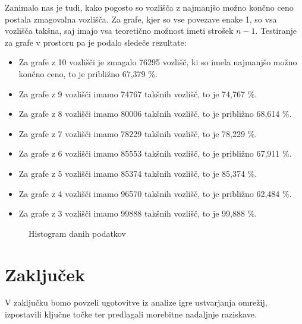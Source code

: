 \documentclass[fin1, tisk]{fmfdelo}
\begin{document}
Zanimalo nas je tudi, kako pogosto so vozlišča z najmanjšo možno končno ceno postala zmagovalna vozlišča. Za grafe, kjer so vse povezave enake 1, so vsa vozlišča takšna, saj imajo vsa teoretično možnost imeti strošek \(n-1\). Testiranje za grafe v prostoru pa je podalo sledeče rezultate:

\begin{itemize}
    \item Za grafe z 10 vozlišči je zmagalo 76295 vozlišč, ki so imela najmanjšo možno končno ceno, to je približno 67,379 \%.
    \item Za grafe z 9 vozlišči imamo 74767 takšnih vozlišč, to je 74,767 \%.
    \item Za grafe z 8 vozlišči imamo 80006 takšnih vozlišč, to je približno 68,614 \%.
    \item Za grafe z 7 vozlišči imamo 78229 takšnih vozlišč, to je 78,229 \%.
    \item Za grafe z 6 vozlišči imamo 85553 takšnih vozlišč, to je približno 67,911 \%.
    \item Za grafe z 5 vozlišči imamo 85374 takšnih vozlišč, to je 85,374 \%.
    \item Za grafe z 4 vozlišči imamo 96570 takšnih vozlišč, to je približno 62,484 \%.
    \item Za grafe z 3 vozlišči imamo 99888 takšnih vozlišč, to je 99,888 \%.
\end{itemize}

\begin{figure}[h]
    \centering
    \caption{Histogram danih podatkov}
    \label{fig:histogram}
\end{figure}

\section{Zaključek}

V zaključku bomo povzeli ugotovitve iz analize igre ustvarjanja omrežij, izpostavili ključne točke ter predlagali morebitne nadaljnje raziskave.
\end{document}
